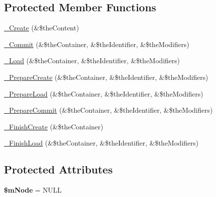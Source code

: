 \subsection*{Protected Member Functions}
\begin{DoxyCompactItemize}
\item 
\hyperlink{class_c_graph_node_a90e49bf5e95ccf3c8644196696154268}{\-\_\-\-Create} (\&\$the\-Content)
\item 
\hyperlink{class_c_graph_node_a7af17771eaba24551f8c9a465f391c23}{\-\_\-\-Commit} (\&\$the\-Container, \&\$the\-Identifier, \&\$the\-Modifiers)
\item 
\hyperlink{class_c_graph_node_a60c57e754245042fe04dad8fb63a5fec}{\-\_\-\-Load} (\&\$the\-Container, \&\$the\-Identifier, \&\$the\-Modifiers)
\item 
\hyperlink{class_c_graph_node_a500c59ddfbec7fedf8598ee5d886de67}{\-\_\-\-Prepare\-Create} (\&\$the\-Container, \&\$the\-Identifier, \&\$the\-Modifiers)
\item 
\hyperlink{class_c_graph_node_af9f27bcc601672903af33f33d62e7ebf}{\-\_\-\-Prepare\-Load} (\&\$the\-Container, \&\$the\-Identifier, \&\$the\-Modifiers)
\item 
\hyperlink{class_c_graph_node_ad55d35f1ac947bae32fe8019daf05112}{\-\_\-\-Prepare\-Commit} (\&\$the\-Container, \&\$the\-Identifier, \&\$the\-Modifiers)
\item 
\hyperlink{class_c_graph_node_a8a8df45cff2375d0bcbb15342ae3960b}{\-\_\-\-Finish\-Create} (\&\$the\-Container)
\item 
\hyperlink{class_c_graph_node_a23c2beb0fbed1ab67018dd9d78dee8fa}{\-\_\-\-Finish\-Load} (\&\$the\-Container, \&\$the\-Identifier, \&\$the\-Modifiers)
\end{DoxyCompactItemize}
\subsection*{Protected Attributes}
\begin{DoxyCompactItemize}
\item 
\hypertarget{class_c_graph_node_a40dc6c9b05b762da268bc527320d59a7}{{\bfseries \$m\-Node} = N\-U\-L\-L}\label{class_c_graph_node_a40dc6c9b05b762da268bc527320d59a7}

\end{DoxyCompactItemize}


